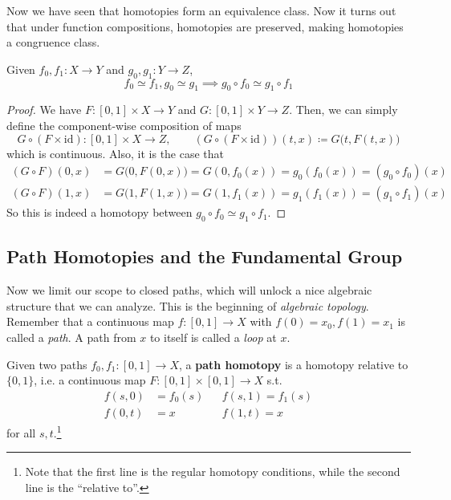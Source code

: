   Now we have seen that homotopies form an equivalence class. Now it turns out that under function compositions, homotopies are preserved, making homotopies a congruence class. 

  \begin{theorem}
    Given $f_0, f_1: X \to Y$ and $g_0, g_1: Y \to Z$, 
    \begin{equation}
      f_0 \simeq f_1, g_0 \simeq g_1 \implies g_0 \circ f_0 \simeq g_1 \circ f_1 
    \end{equation}
  \end{theorem}
  \begin{proof}
    We have $F: [0, 1] \times X \to Y$ and $G: [0, 1] \times Y \to Z$. Then, we can simply define the component-wise composition of maps
    \begin{equation}
      G \circ (F \times \mathrm{id}): [0, 1] \times X \to Z, \qquad (G \circ (F \times \mathrm{id})) (t, x) \coloneqq G \big(t, F(t, x) \big)
    \end{equation} 
    which is continuous. Also, it is the case that 
    \begin{align}
      (G \circ F) (0, x) & = G\big(0, F(0, x) \big) = G (0, f_0 (x)) = g_0 (f_0 (x)) = (g_0 \circ f_0) (x) \\ 
      (G \circ F) (1, x) & = G\big(1, F(1, x) \big) = G (1, f_1 (x)) = g_1 (f_1 (x)) = (g_1 \circ f_1) (x) 
    \end{align}
    So this is indeed a homotopy between $g_0 \circ f_0 \simeq g_1 \circ f_1$. 
  \end{proof}

\subsection{Path Homotopies and the Fundamental Group}

  Now we limit our scope to closed paths, which will unlock a nice algebraic structure that we can analyze. This is the beginning of \textit{algebraic topology}. Remember that a continuous map $f: [0, 1] \to X$ with $f(0) = x_0, f(1) = x_1$ is called a \textit{path}. A path from $x$ to itself is called a \textit{loop} at $x$. 
  
  \begin{definition}
    Given two paths $f_0, f_1: [0, 1] \to X$, a \textbf{path homotopy} is a homotopy relative to $\{0, 1\}$, i.e. a continuous map $F: [0, 1] \times [0, 1] \to X$ s.t. 
    \begin{align}
      f(s, 0) & = f_0 (s) && f(s, 1) = f_1 (s) \\ 
      f(0, t) & = x && f(1, t) = x
    \end{align}
    for all $s, t$.\footnote{Note that the first line is the regular homotopy conditions, while the second line is the ``relative to''.}
  \end{definition}

